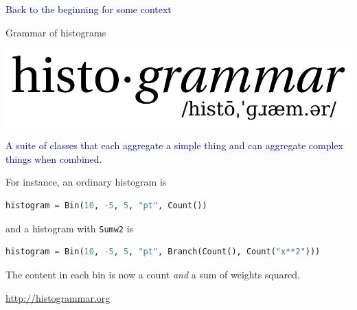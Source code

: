 \documentclass{beamer}
\begin{document}
\begin{frame}{}
\begin{center}
\textcolor{darkblue}{\Large Back to the beginning for some context}
\end{center}
\end{frame}

\begin{frame}[fragile]{Grammar of histograms}
\vspace{0.5 cm}
\begin{center}
\includegraphics[width=0.5\linewidth]{histogrammar-logo.png}
\end{center}

\textcolor{darkblue}{A suite of classes that each aggregate a simple thing and can aggregate complex things when combined.}

\vspace{0.35 cm}
For instance, an ordinary histogram is

\begin{lstlisting}[language=python]
histogram = Bin(10, -5, 5, "pt", Count())
\end{lstlisting}

and a histogram with {\tt\small Sumw2} is

\begin{lstlisting}[language=python]
histogram = Bin(10, -5, 5, "pt", Branch(Count(), Count("x**2")))
\end{lstlisting}

The content in each bin is now a count {\it and} a sum of weights squared.

\begin{center}
\textcolor{darkblue}{\url{http://histogrammar.org}}
\end{center}
\end{frame}
\end{document}
